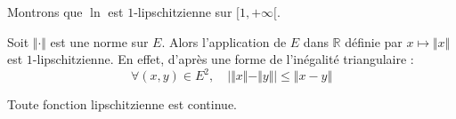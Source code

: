 \documentclass[a4paper,10pt]{report}
\begin{document}
\medskip

\begin{exems}
\item Montrons que $\ln$ est $1$-lipschitzienne sur $[1, + \infty[$.

\medskip

\vspace{5cm}
%
\item Soit $\Vert \cdot \Vert$ est une norme sur $E$. Alors l'application de $E$ dans $\mathbb{R}$ définie par $x \mapsto \Vert x \Vert$ est $1$-lipschitzienne. En effet, d'après une forme de l'inégalité triangulaire :
$$ \forall (x,y) \in E^2, \quad \vert \Vert x \Vert - \Vert y \Vert \vert \leq \Vert x -y \Vert $$
\end{exems}

\begin{thm} Toute fonction lipschitzienne est continue. 
\end{thm}

\begin{preuve} 
%
%
%

\vspace{4cm}
\end{preuve}
\end{document}
